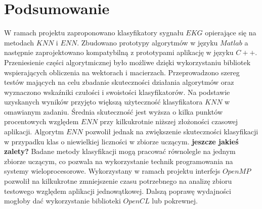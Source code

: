 \section*{Podsumowanie}

W ramach projektu zaproponowano klasyfikatory sygnału $EKG$ opierające się na metodach $KNN$ i $ENN$. Zbudowano prototypy algorytmów w języku $Matlab$ a następnie zaprojektowano kompatybilną z prototypami aplikację w języku $C++$. Przeniesienie części algorytmicznej było możliwe dzięki wykorzystaniu bibliotek wspierających obliczenia na wektorach i macierzach. 
Przeprowadzono szereg testów mających na celu zbadanie skuteczności działania algorytmów oraz wyznaczono wskaźniki czułości i swoistości klasyfikatorów. Na podstawie uzyskanych wyników przyjęto większą użyteczność klasyfikatora $KNN$ w omawianym zadaniu. Średnia skuteczność jest wyższa o kilka punktów procentowych względem $ENN$ przy kilkukrotnie niższej złożoności czasowej aplikacji. Algorytm $ENN$ pozwolił jednak na zwiększenie skuteczności klasyfikacji w przypadku klas o niewielkiej liczności w zbiorze uczącym. \textbf{jeszcze jakieś zalety?}
Badane metody klasyfikacji mogą pracować równolegle na jednym zbiorze uczącym, co pozwala na wykorzystanie technik programowania na systemy wieloprocesorowe. Wykorzystany w ramach projektu interfejs $OpenMP$ pozwolił na kilkukrotne zmniejszenie czasu potrzebnego na analizę zbioru testowego względem aplikacji jednowątkowej. Dalszą poprawę wydajności mogłoby dać wykorzystanie biblioteki $OpenCL$ lub pokrewnej.
